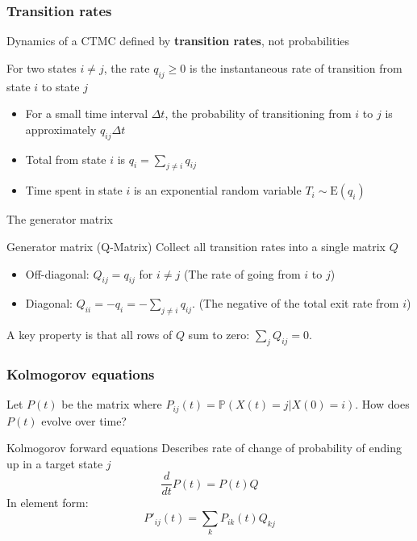 \documentclass[aspectratio=169]{beamer}
\begin{document}
\begin{frame}
    \frametitle{Transition rates}
    Dynamics of a CTMC defined by \textbf{transition rates}, not probabilities

    \begin{definition}
        For two states $i \neq j$, the rate $q_{ij} \ge 0$ is the instantaneous rate of transition from state $i$ to state $j$
        \begin{itemize}
            \item For a small time interval $\Delta t$, the probability of transitioning from $i$ to $j$ is approximately $q_{ij} \Delta t$
            \item Total  from state $i$ is $q_i = \sum_{j \neq i} q_{ij}$
            \item Time spent in state $i$ is an exponential random variable $T_i \sim \text{E}(q_i)$
        \end{itemize}
    \end{definition}
\end{frame}
    
\begin{frame}{The generator matrix}
    \begin{block}{Generator matrix (Q-Matrix)}
        Collect all transition rates into a single matrix $Q$
        \begin{itemize}
            \item Off-diagonal: $Q_{ij} = q_{ij}$ for $i \neq j$ (The rate of going from $i$ to $j$)
            \item Diagonal: $Q_{ii} = -q_i = -\sum_{j \neq i} q_{ij}$. (The negative of the total exit rate from $i$)
        \end{itemize}
        A key property is that all rows of $Q$ sum to zero: $\sum_{j} Q_{ij} = 0$.
    \end{block}
    
\end{frame}


\begin{frame}
    \frametitle{Kolmogorov equations}
    Let $P(t)$ be the matrix where $P_{ij}(t) = \mathbb{P}(X(t)=j | X(0)=i)$. How does $P(t)$ evolve over time?
    \vspace{1em}
    
    \begin{alertblock}{Kolmogorov forward equations}
        Describes rate of change of probability of ending up in a target state $j$
        $$ \frac{d}{dt}P(t) = P(t)Q $$
        In element form:
        $$ P'_{ij}(t) = \sum_{k} P_{ik}(t) Q_{kj} $$
    \end{alertblock}
\end{frame}
\end{document}

